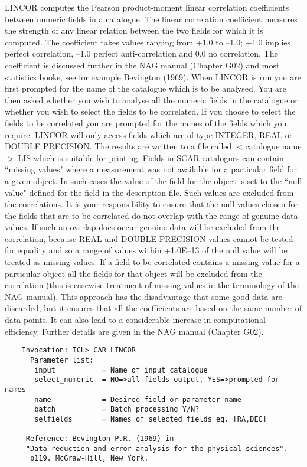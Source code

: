 LINCOR computes the Pearson product-moment linear correlation
coefficients between numeric fields in a catalogue.
The linear correlation coefficient measures the strength of any
linear relation between the two fields for which it is computed.
The coefficient takes values ranging from +1.0 to --1.0; +1.0
implies perfect correlation, --1.0 perfect anti-correlation
and 0.0 no correlation. 
The coefficient is discussed further in the NAG manual (Chapter G02) 
and most statistics books, see for example Bevington (1969).
When LINCOR is run you are first prompted for the name
of the catalogue which is to be analysed. 
You are then asked whether you wish to analyse all the numeric fields in 
the catalogue or whether you wish to select the fields to be correlated. 
If you choose to select the fields to be correlated you are prompted for 
the names of the fields which you require. 
LINCOR will only access fields which are of type INTEGER, REAL or DOUBLE 
PRECISION. 
The results are written to a file called $<$catalogue name$>$.LIS which 
is suitable for printing.
Fields in SCAR catalogues can contain ``missing values" where a
measurement was not available for a particular field for a given
object. 
In such cases the value of the field for the object is set to the ``null 
value" defined for the field in the description file. 
Such values are excluded from the correlations.
It is your responsibility to ensure that the null values
chosen for the fields that are to be correlated do not overlap with
the range of genuine data values. 
If such an overlap does occur genuine data will be excluded from the 
correlation, because REAL and DOUBLE PRECISION values cannot be tested for 
equality and so a range of values within \underline{+}1.0E--13 of the null 
value will be treated as missing values.
If a field to be correlated contains a missing value for a
particular object all the fields for that object will be excluded
from the correlation (this is casewise treatment of missing values
in the terminology of the NAG manual). 
This approach has the disadvantage that some good data are discarded, but 
it ensures that all the coefficients are based on the same number of data 
points. 
It can also lead to a considerable increase in computational efficiency.
Further details are given in the NAG manual (Chapter G02).
\begin{verbatim}
    Invocation: ICL> CAR_LINCOR
      Parameter list:
       input           = Name of input catalogue
       select_numeric  = NO=>all fields output, YES=>prompted for names
       name            = Desired field or parameter name
       batch           = Batch processing Y/N?
       selfields       = Names of selected fields eg. [RA,DEC]

     Reference: Bevington P.R. (1969) in
     "Data reduction and error analysis for the physical sciences".
      p119. McGraw-Hill, New York.
\end{verbatim}
 

